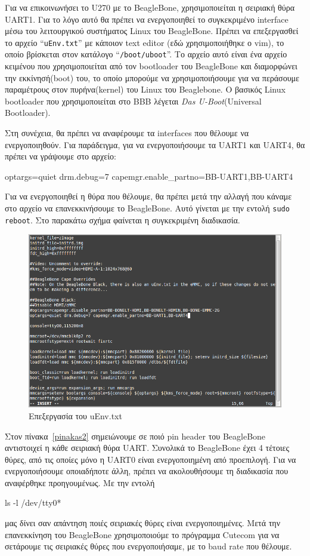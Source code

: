 \documentclass[12pt, a4paper, oneside]{report}
\begin{document}
Για να επικοινωνήσει το U270 με το BeagleBone, χρησιμοποιείται η σειριακή θύρα UART1. Για το λόγο αυτό θα πρέπει να ενεργοποιηθεί το συγκεκριμένο interface μέσω του λειτουργικού συστήματος Linux του BeagleBone. Πρέπει να επεξεργασθεί το αρχείο ``\texttt{uEnv.txt}'' με κάποιον text editor (εδώ χρησιμοποιήθηκε ο vim), το οποίο βρίσκεται στον κατάλογο ``\texttt{\slash boot\slash uboot}''. Το αρχείο αυτό είναι ένα αρχείο κειμένου που χρησιμοποιείται από τον bootloader του BeagleBone και διαμορφώνει την εκκίνησή(boot) του, το οποίο μπορούμε να χρησιμοποιήσουμε για να περάσουμε παραμέτρους στον πυρήνα(kernel) του Linux του Beaglebone. Ο βασικός Linux bootloader που χρησιμοποιείται στο BBB λέγεται \textenglish{\emph{Das U-Boot}(Universal Bootloader)}.

Στη συνέχεια, θα πρέπει να αναφέρουμε τα interfaces που θέλουμε να ενεργοποιηθούν. Για παράδειγμα, για να ενεργοποιήσουμε τα UART1 και UART4, θα πρέπει να γράψουμε στο αρχείο: 
\begin{code}
optargs=quiet drm.debug=7 capemgr.enable_partno=BB-UART1,BB-UART4
\end{code}

Για να ενεργοποιηθεί η θύρα που θέλουμε, θα πρέπει μετά την αλλαγή που κάναμε στο αρχείο να επανεκκινήσουμε το BeagleBone. Αυτό γίνεται με την εντολή \verb+sudo reboot+. Στο παρακάτω σχήμα φαίνεται η συγκεκριμένη διαδικασία.

\begin{figure}[!hb]
\centering
\includegraphics[scale=0.6]{eikona_30}
\caption{Επεξεργασία του uEnv.txt}\label{eik30}
\end{figure}

Στον πίνακα~\ref{pinakas2} σημειώνουμε σε ποιό pin header του BeagleBone αντιστοιχεί η κάθε σειριακή θύρα UART. Συνολικά το BeagleBone έχει 4 τέτοιες θύρες, από τις οποίες μόνο η UART0 είναι ενεργοποιημένη από προεπιλογή. Για να ενεργοποιήσουμε οποιαδήποτε άλλη, πρέπει να ακολουθήσουμε τη διαδικασία που αναφέρθηκε προηγουμένως. Με την εντολή 
\begin{code}
ls -l /dev/tty0*
\end{code}
μας δίνει σαν απάντηση ποιές σειριακές θύρες είναι ενεργοποιημένες. Μετά την επανεκκίνηση του BeagleBone χρησιμοποιούμε το πρόγραμμα Cutecom για να σετάρουμε τις σειριακές θύρες που ενεργοποιήσαμε, με το baud rate που θέλουμε.
\end{document}
